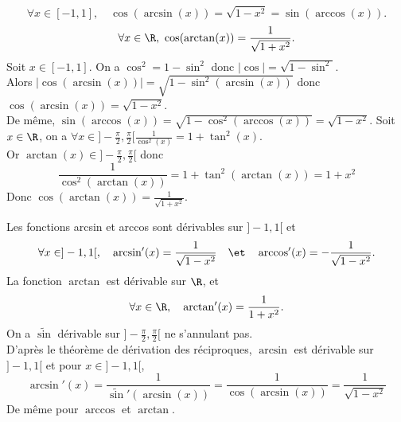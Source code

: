 \documentclass[11pt]{article}
\begin{document}
\begin{lemme}{}{}
    \begin{equation*}
        \forall x\in[-1,1],\quad\cos(\arcsin(x))=\sqrt{1-x^2}=\sin(\arccos(x)).
    \end{equation*}
    \begin{equation*}
        \forall x\in\R,~\cos(\arctan(x))=\frac{1}{\sqrt{1+x^2}}.
    \end{equation*}
    \tcblower
    Soit $x\in[-1,1]$. On a $\cos^2=1-\sin^2$ donc $|\cos|=\sqrt{1-\sin^2}$.\\
    Alors $|\cos(\arcsin(x))|=\sqrt{1-\sin^2(\arcsin(x))}$ donc $\cos(\arcsin(x))=\sqrt{1-x^2}$.\\
    De même, $\sin(\arccos(x))=\sqrt{1-\cos^2(\arccos(x))}=\sqrt{1-x^2}$.\n
    Soit $x\in\R$, on a $\forall x\in]-\frac{\pi}{2},\frac{\pi}{2}[ \frac{1}{\cos^2(x)}=1+\tan^2(x)$.\\
    Or $\arctan(x)\in]-\frac{\pi}{2},\frac{\pi}{2}[$ donc
    \begin{equation*}
        \frac{1}{\cos^2(\arctan(x))}=1+\tan^2(\arctan(x))=1+x^2
    \end{equation*}
    Donc $\cos(\arctan(x))=\frac{1}{\sqrt{1+x^2}}$.
\end{lemme}

\begin{prop}{}{}
    Les fonctions arcsin et arccos sont dérivables sur $]-1,1[$ et
    \begin{equation*}
        \forall x\in]-1,1[,\quad\arcsin'(x)=\frac{1}{\sqrt{1-x^2}}\quad\et\quad\arccos'(x)=-\frac{1}{\sqrt{1-x^2}}.
    \end{equation*}
    La fonction $\arctan$ est dérivable sur $\R$, et
    \begin{equation*}
        \forall x\in\R,\quad\arctan'(x)=\frac{1}{1+x^2}.
    \end{equation*}
    \tcblower
    On a $\tilde{\sin}$ dérivable sur $]-\frac{\pi}{2},\frac{\pi}{2}[$ ne s'annulant pas.\\
    D'après le théorème de dérivation des réciproques, $\arcsin$ est dérivable sur $]-1,1[$ et pour $x\in]-1,1[$,
    \begin{equation*}
        \arcsin'(x)=\frac{1}{\tilde{\sin}'(\arcsin(x))}=\frac{1}{\cos(\arcsin(x))}=\frac{1}{\sqrt{1-x^2}}
    \end{equation*}
    De même pour $\arccos$ et $\arctan$.
\end{prop}
\end{document}
